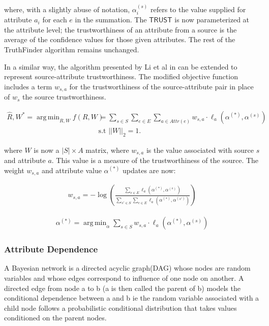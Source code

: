\documentclass{acm_proc_article-sp}
\DeclareMathOperator*{\argmin}{arg\,min}
\begin{document}
where, with a slightly abuse of notation, $\alpha_i^{(s)}$ refers to the value supplied for attribute $a_i$ for each $e$ in the summation. The  $\mathsf{TRUST}$ is now parameterized at the attribute level; the trustworthiness of an attribute from a source is the average of the confidence values for those given attributes. The rest of the {\sc TruthFinder} algorithm remains unchanged. 


In a similar way, the algorithm presented by Li et al in \cite{li:resolving} can be extended to represent source-attribute trustworthiness. The modified objective function includes a term $w_{s,a}$ for the trustworthiness of the source-attribute pair in place of $w_s$ the source trustworthiness. 

\begin{align}
\hat{R}, W^* = \argmin_{R,W} f(R, W) & = \sum_{s \in S} \sum_{e \in E} \sum_{a \in Attr(e)} w_{s,a} \cdot \ell_a(\alpha^{(*)}, \alpha^{(s)}) \\
& \text{s.t } ||W||_2 =1. \nonumber 
\end{align}

where  $W$ is now a $|S|\times A$ matrix, where $w_{s,a}$ is the value associated with source $s$ and attribute $a$. This value is a measure of the trustworthiness of the source. The weight $w_{s,a}$ and attribute value $\alpha^{(*)}$ updates are now: 


\begin{align}
w_{s,a} = - \log \left ( \frac{\sum_{e \in E} \ell_a(\alpha^{(*)}, \alpha^{(s)})}{\sum_{s' \in S} \sum_{e \in E}  \ell_a(\alpha^{(*)}, \alpha^{(s')})} \right )
\end{align}

\begin{align}
\alpha^{(*)} = \argmin_\alpha \sum_{s \in S} w_{s,a} \cdot \ell_a(\alpha^{(*)}, \alpha^{(s)})
\end{align}


\subsubsection{Attribute Dependence}

A Bayesian network is a directed acyclic graph(DAG) whose nodes are random variables and whose edges correspond to influence of one node on another. A directed edge from node a to b (a is then called the parent of b) models the conditional dependence between a and b ie the random variable associated with a child node follows a probabilistic conditional distribution that takes values conditioned on the parent nodes.
\end{document}

